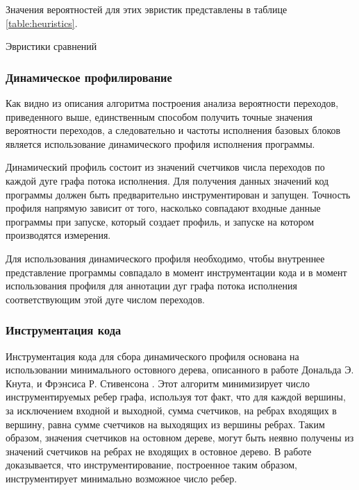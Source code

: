 Значения вероятностей для этих эвристик представлены в таблице \ref{table:heuristics}.

\begin{table}
\caption{Эвристики сравнений}

\label{table:heuristics}
\end{table}

\subsubsection{Динамическое профилирование}

Как видно из описания алгоритма построения анализа вероятности переходов, приведенного выше, единственным способом получить точные значения вероятности переходов, а следовательно и частоты исполнения базовых блоков является использование динамического профиля исполнения программы.

Динамический профиль состоит из значений счетчиков числа переходов по каждой дуге графа потока исполнения. Для получения данных значений код программы должен быть предварительно инструментирован и запущен. Точность профиля напрямую зависит от того, насколько совпадают входные данные программы при запуске, который создает профиль, и запуске на котором производятся измерения.

Для использования динамического профиля необходимо, чтобы внутреннее представление программы совпадало в момент инструментации кода и в момент использования профиля для аннотации дуг графа потока исполнения соответствующим этой дуге числом переходов.

\subsubsection{Инструментация кода}

Инструментация кода для сбора динамического профиля основана на использовании минимального остовного дерева, описанного в работе Дональда Э. Кнута, и Фрэнсиса Р. Стивенсона \cite{Knuth_Stevenson_1973}.
Этот алгоритм минимизирует число инструментируемых ребер графа, используя тот факт, что для каждой вершины, за исключением входной и выходной, сумма счетчиков, на ребрах входящих в вершину, равна сумме счетчиков на выходящих из вершины ребрах.
Таким образом, значения счетчиков на остовном дереве, могут быть неявно получены из значений счетчиков на ребрах не входящих в остовное дерево.
В работе доказывается, что инструментирование, построенное таким образом, инструментирует минимально возможное число ребер.

